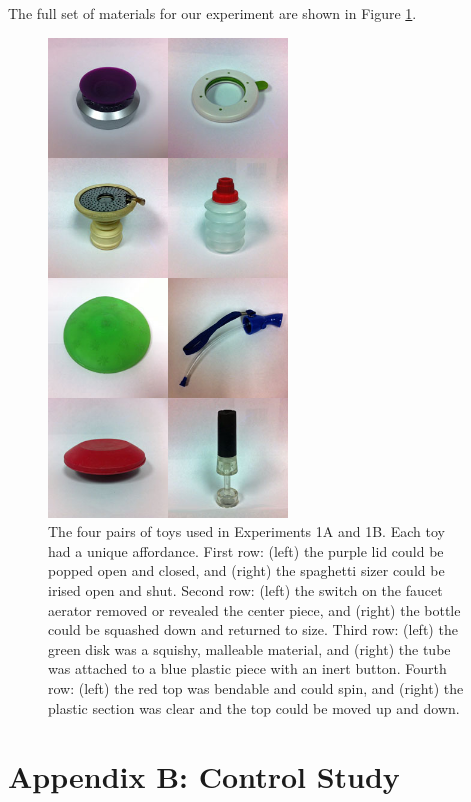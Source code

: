 \documentclass[man]{apa2}
\begin{document}
The full set of materials for our experiment are shown in Figure \ref{fig:toys}. 
\begin{figure}
  \begin{center} 
    \includegraphics[width=2.5in]{figures/discourse_toys_images.jpg} 

    \caption{\label{fig:toys} The four pairs of toys used in Experiments 1A and 1B. Each toy had a unique affordance. First row: (left) the purple lid could be popped open and closed, and (right) the spaghetti sizer could be irised open and shut.  Second row: (left) the switch on the faucet aerator removed or revealed the center piece, and (right) the bottle could be squashed down and returned to size.  Third row: (left) the green disk was a squishy, malleable material, and (right) the tube was attached to a blue plastic piece with an inert button.  Fourth row: (left) the red top was bendable and could spin, and (right) the plastic section was clear and the top could be moved up and down. } 

  \end{center} 
\end{figure}

\section{Appendix B: Control Study}
\end{document}
